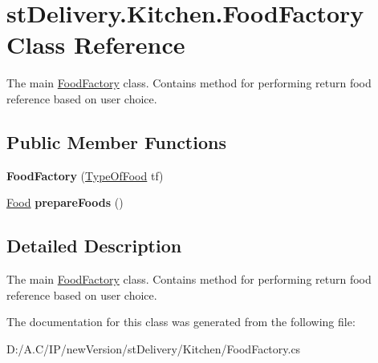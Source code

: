 \hypertarget{classst_delivery_1_1_kitchen_1_1_food_factory}{}\section{st\+Delivery.\+Kitchen.\+Food\+Factory Class Reference}
\label{classst_delivery_1_1_kitchen_1_1_food_factory}


The main \hyperlink{classst_delivery_1_1_kitchen_1_1_food_factory}{Food\+Factory} class. Contains method for performing return food reference based on user choice.  


\subsection*{Public Member Functions}
\begin{DoxyCompactItemize}
\item 
\mbox{\label{classst_delivery_1_1_kitchen_1_1_food_factory_ae918579f1903e7c4f8e821c917c9fe72}} 
{\bfseries Food\+Factory} (\hyperlink{namespacest_delivery_1_1_kitchen_a7c971dd83dd8457a7495309917619132}{Type\+Of\+Food} tf)
\item 
\mbox{\label{classst_delivery_1_1_kitchen_1_1_food_factory_ae235d03c2278dc27a76cf47356baf0e8}} 
\hyperlink{classst_delivery_1_1_kitchen_1_1_food}{Food} {\bfseries prepare\+Foods} ()
\end{DoxyCompactItemize}


\subsection{Detailed Description}
The main \hyperlink{classst_delivery_1_1_kitchen_1_1_food_factory}{Food\+Factory} class. Contains method for performing return food reference based on user choice. 



The documentation for this class was generated from the following file\+:\begin{DoxyCompactItemize}
\item 
D\+:/\+A.\+C/\+I\+P/new\+Version/st\+Delivery/\+Kitchen/Food\+Factory.\+cs\end{DoxyCompactItemize}
